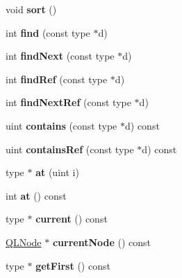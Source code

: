 \begin{DoxyCompactItemize}
void {\bfseries sort} ()
\item 
\mbox{\label{class_q_internal_list_a29473d9768c95f84b196253f31c5979d}} 
int {\bfseries find} (const type $\ast$d)
\item 
\mbox{\label{class_q_internal_list_a1b3c68c7eb59847ae46040e5aaa1679a}} 
int {\bfseries find\+Next} (const type $\ast$d)
\item 
\mbox{\label{class_q_internal_list_a814aac1d1607da1df00372fb6b02617f}} 
int {\bfseries find\+Ref} (const type $\ast$d)
\item 
\mbox{\label{class_q_internal_list_ab7bfec717081f3bb7d0c2e3a811544c3}} 
int {\bfseries find\+Next\+Ref} (const type $\ast$d)
\item 
\mbox{\label{class_q_internal_list_a1a238f3b1bfdcee9c95cdf2bde112bbe}} 
uint {\bfseries contains} (const type $\ast$d) const
\item 
\mbox{\label{class_q_internal_list_a5452dd5c9185e5a121e15f9d6315a2cd}} 
uint {\bfseries contains\+Ref} (const type $\ast$d) const
\item 
\mbox{\label{class_q_internal_list_a339c4e193ab4b87c102da0b9caeaa585}} 
type $\ast$ {\bfseries at} (uint i)
\item 
\mbox{\label{class_q_internal_list_a63c4c803ea5101986b16c8cbd79d65c3}} 
int {\bfseries at} () const
\item 
\mbox{\label{class_q_internal_list_af732bba6324ce7b0d96ef2ccbfc15f15}} 
type $\ast$ {\bfseries current} () const
\item 
\mbox{\label{class_q_internal_list_a68fe90fdab6a5680413cf11080932243}} 
\mbox{\hyperlink{class_q_l_node}{Q\+L\+Node}} $\ast$ {\bfseries current\+Node} () const
\item 
\mbox{\label{class_q_internal_list_aecb112a12d9edab4f6064da5e37791e9}} 
type $\ast$ {\bfseries get\+First} () const

\end{DoxyCompactItemize}

